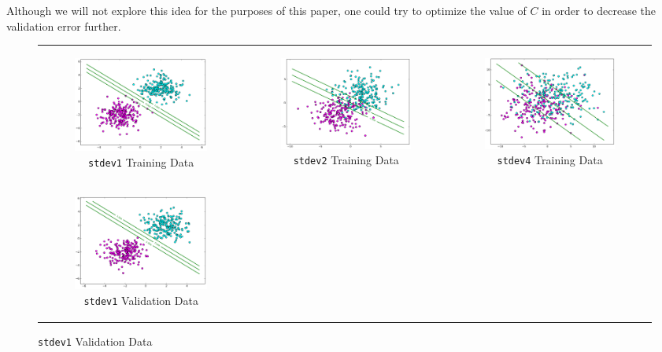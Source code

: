 \documentclass{sigchi}
\begin{document}
Although we will not explore this idea for the purposes of this paper, one could try to optimize the value of $C$ in order to decrease the validation error further.

\begin{figure}[!ht]
\centering
\begin{tabular}{c c c}
\begin{subfigure}[b]{2.25in}
	\includegraphics[width=2.25in]{plots/1-2/stdev1train.png}
	\caption{\texttt{stdev1} Training Data}
\end{subfigure} &

\begin{subfigure}[b]{2.25in}
	\includegraphics[width=2.25in]{plots/1-2/stdev2train.png}
	\caption{\texttt{stdev2} Training Data}
\end{subfigure} &

\begin{subfigure}[b]{2.25in}
	\includegraphics[width=2.25in]{plots/1-2/stdev4train.png}
	\caption{\texttt{stdev4} Training Data}
\end{subfigure} \\

\begin{subfigure}[b]{2.25in}
	\includegraphics[width=2.25in]{plots/1-2/stdev1valid.png}
	\caption{\texttt{stdev1} Validation Data}
\end{subfigure} &


\end{tabular}
\end{figure}
\end{document}
